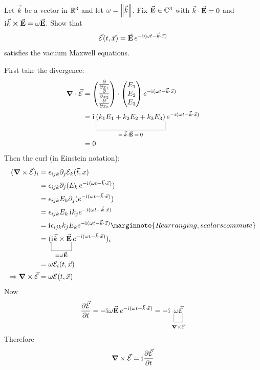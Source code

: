 \documentclass[10pt]{article}
\begin{document}
\begin{example}
	Let $\vec{k}$ be a vector in $\mathbb{R}^3$ and let $\omega = \norm{\vec{k}}$.
	Fix $\vec{\bf E} \in \mathbb{C}^3$ with $\vec{k} \cdot \vec{\bf E} = 0$ and
	$\mathrm{i}\mkern1mu \vec{k} \cross \vec{\bf E} = \omega\vec{\bf E}$.
	Show that 
	$$
		\vec{\cal E}(t, \vec{x}) = \vec{\bf E} \, e^{-\mathrm{i}\mkern1mu\lparen\omega t - \vec{k}\cdot \vec{x}\rparen}
	$$
	satisfies the vacuum Maxwell equations.
\end{example}
\sol First take the divergence:
$$
\begin{aligned}
	\grad \cdot \vec{\cal E} &= 
	\begin{pmatrix}
		\pd{}{x_1} \\ \pd{}{x_2} \\ \pd{}{x_3}
	\end{pmatrix} \cdot 
	\begin{pmatrix}
		E_1 \\ E_2 \\ E_3
	\end{pmatrix} e^{-\di\p{\omega t - \vec{k}\cdot \vec{x}}} \\
	&= \di \ub{(k_1 E_1 + k_2 E_2 + k_3 E_3)}{= \: \vec{k} \cdot \vec{\bf E} \:= \: 0} e^{-\di\p{\omega t - \vec{k}\cdot \vec{x}}} \\
	&= 0
\end{aligned}
$$
Then the curl (in Einstein notation):
$$
\begin{aligned}
	(\grad \times \vec{\cal E})_i &= \epsilon_{ijk}\partial_j{\mc E}_k({\vec t},x)\\
	&= \epsilon_{ijk}\partial_j(E_k \, e^{-\di\p{\omega t - \vec{k}\cdot \vec{x}}})\\
	&= \epsilon_{ijk}E_k\partial_j(e^{-\di\p{\omega t - \vec{k}\cdot \vec{x}}})\\
	&= \epsilon_{ijk}E_k\,\di k_j e^{-\di\p{\omega t - \vec{k}\cdot \vec{x}}}\\\
	&= \di\epsilon_{ijk}k_j E_k e^{-\di\p{\omega t - \vec{k}\cdot \vec{x}}}\marginnote{Rearranging, scalars commute}\\
	&= \p{\ub{\di {\vec k}\times \vec{\bf E}}{= \omega\vec{\bf E}} e^{-\di\p{\omega t - \vec{k}\cdot \vec{x}}}}_i\\
	&= \omega\mc{E}_i(t,{\vec x})\\
	\Rightarrow \grad \times \vec{\cal E} &= \omega\mc{E}(t,{\vec x})
\end{aligned}
$$
Now
$$
\pd{\mc{\vec E}}{t} = -\di\omega \vec{\bf E} \, e^{-\di\p{\omega t - \vec{k}\cdot \vec{x}}} = -\di\ub{\mc{\omega\vec E}}{\grad \times \vec{\cal E}}
$$
Therefore
$$
\grad \times \vec{\cal E} = \mathrm{i}\mkern1mu\frac{\partial \mathcal{\vec E}}{\partial t}
$$
\end{document}
